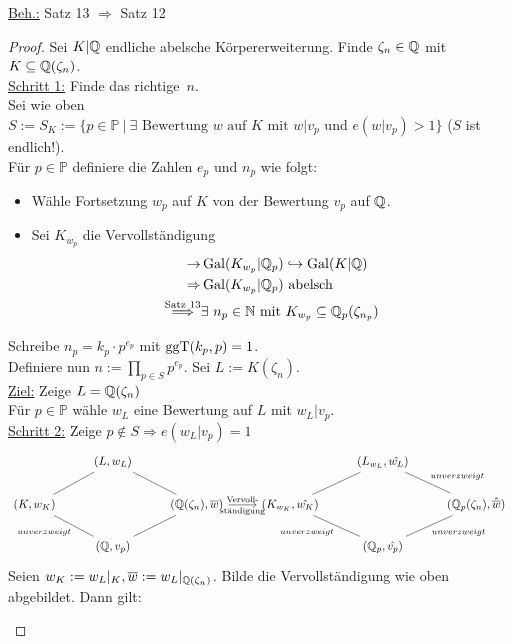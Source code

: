 \underline{Beh.:} Satz 13 $\Rightarrow$ Satz 12
\begin{proof}
Sei $K|\mathbb{Q}$ endliche abelsche Körpererweiterung. Finde $\zeta_n \in \mathbb{Q}$ mit $K \subseteq \mathbb{Q}(\zeta_n)$.\\
\underline{Schritt 1:} Finde das \glqq richtige\grqq \ $n$.\\
Sei wie oben $S:=S_K:=\{p \in \mathbb{P} \ | \ \exists \text{ Bewertung } w \text{ auf } K \text{ mit } w|v_p \text{ und } e(w|v_p)>1\}$ ($S$ ist endlich!).\\
Für $p \in \mathbb{P}$ definiere die Zahlen $e_p$ und $n_p$ wie folgt:
\begin{itemize}
\item Wähle Fortsetzung $w_p$ auf $K$ von der Bewertung $v_p$ auf $\mathbb{Q}$.
\item Sei $K_{w_p}$ die Vervollständigung
\begin{align*}
\rightarrow &\operatorname{Gal}(K_{w_p} | \mathbb{Q}_p) \hookrightarrow \operatorname{Gal}(K | \mathbb{Q})\\
\Rightarrow &\operatorname{Gal}(K_{w_p}|\mathbb{Q}_p) \text{ abelsch}\\
\stackrel{\text{Satz } 13}{\Longrightarrow} &\exists \ n_p \in \mathbb{N} \text{ mit } K_{w_p} \subseteq \mathbb{Q}_p(\zeta_{n_p})
\end{align*}
\end{itemize}
Schreibe $n_p=k_p\cdot p^{e_p}$ mit $\operatorname{ggT}(k_p,p)=1$.\\
Definiere nun $n:=\prod_{p \in S} p^{e_p}$. Sei $L:=K(\zeta_n)$.\\
\underline{Ziel:} Zeige $L=\mathbb{Q}(\zeta_n)$\\
Für $p \in \mathbb{P}$ wähle $w_L$ eine Bewertung auf $L$ mit $w_L|v_p$.\\
\underline{Schritt 2:} Zeige $p \not \in S \Rightarrow e(w_L |v_p)=1$
\[
\begin{tikzcd}
& (L,w_L) & & & (L_{w_L}, \hat{w_L})\\
(K,w_K) \arrow[dash, ru] && (\Q(\zeta_n),\overline{w}) \arrow[dash, lu] \arrow{r}{ \text{Vervoll-}}[swap]{\text{ständigung}} & (K_{w_K}, \hat{w_K}) \arrow[dash, ru] && (\Q_p(\zeta_n), \hat{\overline{w}}) \arrow[dash, lu, swap, "unverzweigt"]\\
& (\Q,v_p) \arrow[dash, lu, "unverzweigt"] \arrow[dash, ru] &&&(\Q_p, \hat{v_p}) \arrow[dash, lu, "unverzweigt"] \arrow[dash, ru, swap, "unverzweigt"]
\end{tikzcd}
\]
Seien $w_K:=w_L|_K, \overline{w}:=w_L|_{\mathbb{Q}(\zeta_n)}$. Bilde die Vervollständigung wie oben abgebildet. Dann gilt:
\begin{itemize}

\end{itemize}
\end{proof}
